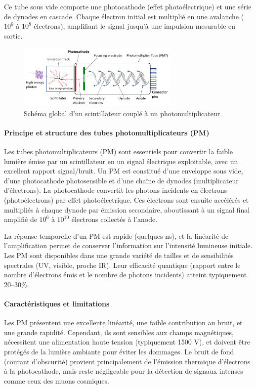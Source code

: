 \documentclass[a4paper,12pt,twoside]{article}
\begin{document}

Ce tube sous vide comporte une photocathode (effet photoélectrique) et une série de dynodes en cascade. Chaque électron initial est multiplié en une avalanche ($10^6$ à $10^8$ électrons), amplifiant le signal jusqu’à une impulsion mesurable en sortie.

\begin{figure}[H]
  \centering
  \includegraphics[width=0.7\textwidth]{Images/PhotoMultiplierTubeAndScintillator.png}
  \caption{Schéma global d’un scintillateur couplé à un photomultiplicateur}
  \label{fig:pm_scintillator}
\end{figure}

\paragraph{Principe et structure des tubes photomultiplicateurs (PM)}
Les tubes photomultiplicateurs (PM) sont essentiels pour convertir la faible lumière émise par un scintillateur en un signal électrique exploitable, avec un excellent rapport signal/bruit. Un PM est constitué d'une enveloppe sous vide, d'une photocathode photosensible et d'une chaîne de dynodes (multiplicateur d'électrons). La photocathode convertit les photons incidents en électrons (photoélectrons) par effet photoélectrique. Ces électrons sont ensuite accélérés et multipliés à chaque dynode par émission secondaire, aboutissant à un signal final amplifié de $10^6$ à $10^{10}$ électrons collectés à l'anode.

La réponse temporelle d'un PM est rapide (quelques ns), et la linéarité de l'amplification permet de conserver l'information sur l'intensité lumineuse initiale. Les PM sont disponibles dans une grande variété de tailles et de sensibilités spectrales (UV, visible, proche IR). Leur efficacité quantique (rapport entre le nombre d'électrons émis et le nombre de photons incidents) atteint typiquement 20--30\%.

\paragraph{Caractéristiques et limitations}
Les PM présentent une excellente linéarité, une faible contribution au bruit, et une grande rapidité. Cependant, ils sont sensibles aux champs magnétiques, nécessitent une alimentation haute tension (typiquement 1500 V), et doivent être protégés de la lumière ambiante pour éviter les dommages. Le bruit de fond (courant d'obscurité) provient principalement de l'émission thermique d'électrons à la photocathode, mais reste négligeable pour la détection de signaux intenses comme ceux des muons cosmiques.
\end{document}
